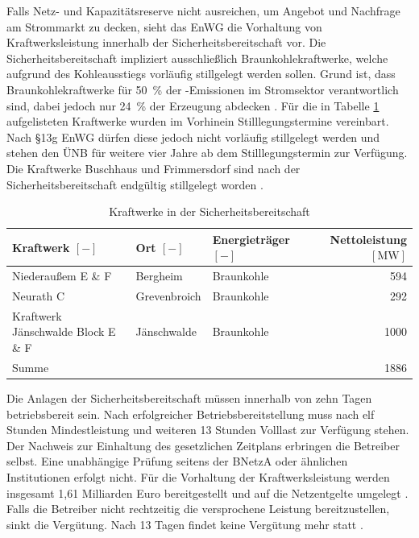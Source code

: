 			Falls Netz- und Kapazitätsreserve nicht ausreichen, um Angebot und Nachfrage am Strommarkt zu decken, sieht das EnWG die Vorhaltung von Kraftwerksleistung innerhalb der Sicherheitsbereitschaft vor.
			Die Sicherheitsbereitschaft impliziert ausschließlich Braunkohlekraftwerke, welche aufgrund des Kohleausstiegs vorläufig stillgelegt werden sollen.
			Grund ist, dass Braunkohlekraftwerke für \SI{50}{\percent} der \COO-Emissionen im Stromsektor verantwortlich sind, dabei jedoch nur \SI{24}{\percent} der Erzeugung abdecken \cite[S. 11 u. S. 31 f.]{Agora_Braunkohle}.		
			Für die in Tabelle \ref{Tab. Kraftwerke Sicherheitsbereitschaft} aufgelisteten Kraftwerke wurden im Vorhinein Stilllegungstermine vereinbart.
			Nach §13g EnWG dürfen diese jedoch nicht vorläufig stillgelegt werden und stehen den ÜNB für weitere vier Jahre ab dem Stilllegungstermin zur Verfügung.
			Die Kraftwerke Buschhaus und Frimmersdorf sind nach der Sicherheitsbereitschaft endgültig stillgelegt worden \cite{EnWG}.  
			\begin{table}[H]
				\centering
				\caption{Kraftwerke in der Sicherheitsbereitschaft \cite{Excel_Kraftwerksliste}}
				\label{Tab. Kraftwerke Sicherheitsbereitschaft}
				\begin{tabular}{lllr}
					\hline
					\makecell[c]{Kraftwerk \\ $\left[-\right]$} & \makecell[c]{Ort \\ $\left[-\right]$} & \makecell[c]{Energieträger \\ $\left[-\right]$} & \makecell[c]{Nettoleistung \\ $\left[\si{\mega\watt}\right]$} \\ \hline 
					Niederaußem E \& F & Bergheim & Braunkohle & \num{594} \\
					Neurath C & Grevenbroich & Braunkohle & \num{292} \\
					Kraftwerk Jänschwalde Block E \& F & Jänschwalde & Braunkohle & \num{1000} \\ \hline
					Summe &  &  & \num{1886} \\ \hline
				\end{tabular}
			\end{table}
			Die Anlagen der Sicherheitsbereitschaft müssen innerhalb von zehn Tagen betriebsbereit sein.
			Nach erfolgreicher Betriebsbereitstellung muss nach elf Stunden Mindestleistung und weiteren 13 Stunden Volllast zur Verfügung stehen.
			Der Nachweis zur Einhaltung des gesetzlichen Zeitplans erbringen die Betreiber selbst.
			Eine unabhängige Prüfung seitens der BNetzA oder ähnlichen Institutionen erfolgt nicht.  
			Für die Vorhaltung der Kraftwerksleistung werden insgesamt 1,61 Milliarden Euro bereitgestellt und auf die Netzentgelte umgelegt \cite{Netz_Kapa_Reserve_NextKraftwerke}.
			Falls die Betreiber nicht rechtzeitig die versprochene Leistung bereitzustellen, sinkt die Vergütung.
			Nach 13 Tagen findet keine Vergütung mehr statt \cite{EnWG}. \\
			
